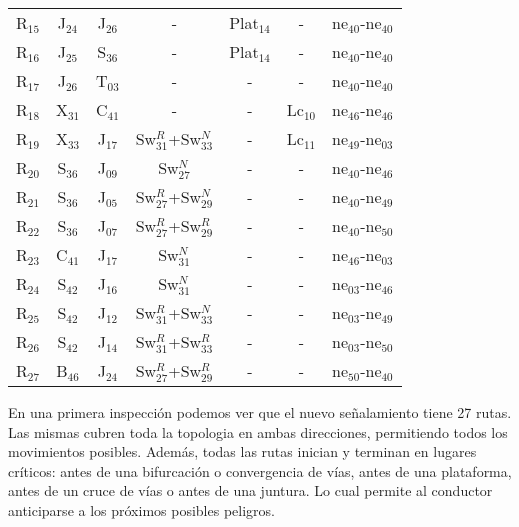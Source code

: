 \begin{table}[H]
{{\begin{tabular}{ c c c c c c c }
					R$_{15}$  & J$_{24}$ & J$_{26}$ & - & Plat$_{14}$ & - & ne$_{40}$-ne$_{40}$\\
					R$_{16}$  & J$_{25}$ & S$_{36}$ & - & Plat$_{14}$ & - & ne$_{40}$-ne$_{40}$\\			
					R$_{17}$  & J$_{26}$ & T$_{03}$ & - & - & - & ne$_{40}$-ne$_{40}$\\
					R$_{18}$  & X$_{31}$ & C$_{41}$ & - & - & Lc$_{10}$ & ne$_{46}$-ne$_{46}$\\
					R$_{19}$  & X$_{33}$ & J$_{17}$ & Sw$_{31}^{R}$+Sw$_{33}^{N}$ & - & Lc$_{11}$ & ne$_{49}$-ne$_{03}$\\
					R$_{20}$  & S$_{36}$ & J$_{09}$ & Sw$_{27}^{N}$ & - & - & ne$_{40}$-ne$_{46}$\\
					R$_{21}$  & S$_{36}$ & J$_{05}$ & Sw$_{27}^{R}$+Sw$_{29}^{N}$ & - & - & ne$_{40}$-ne$_{49}$\\				
					R$_{22}$  & S$_{36}$ & J$_{07}$ & Sw$_{27}^{R}$+Sw$_{29}^{R}$ & - & - & ne$_{40}$-ne$_{50}$\\
					R$_{23}$  & C$_{41}$ & J$_{17}$ & Sw$_{31}^{N}$ & - & - & ne$_{46}$-ne$_{03}$\\	
					R$_{24}$  & S$_{42}$ & J$_{16}$ & Sw$_{31}^{N}$ & - & - & ne$_{03}$-ne$_{46}$\\
					R$_{25}$  & S$_{42}$ & J$_{12}$ & Sw$_{31}^{R}$+Sw$_{33}^{N}$ & - & - & ne$_{03}$-ne$_{49}$\\	
					R$_{26}$  & S$_{42}$ & J$_{14}$ & Sw$_{31}^{R}$+Sw$_{33}^{R}$ & - & - & ne$_{03}$-ne$_{50}$\\	
					R$_{27}$  & B$_{46}$ & J$_{24}$ & Sw$_{27}^{R}$+Sw$_{29}^{R}$ & - & - & ne$_{50}$-ne$_{40}$\\
					\hline
				\end{tabular}
			}
		}
	\end{table}
	
	En una primera inspección podemos ver que el nuevo señalamiento tiene 27 rutas. Las mismas cubren toda la topologia en ambas direcciones, permitiendo todos los movimientos posibles. Además, todas las rutas inician y terminan en lugares críticos: antes de una bifurcación o convergencia de vías, antes de una plataforma, antes de un cruce de vías o antes de una juntura. Lo cual permite al conductor anticiparse a los próximos posibles peligros.